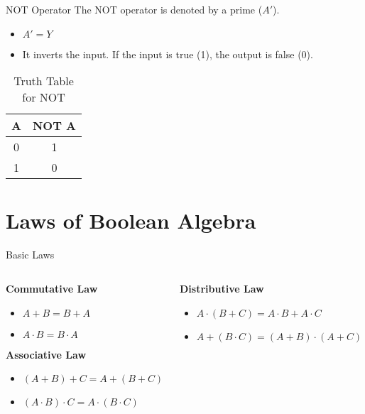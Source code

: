 \documentclass{beamer}
\begin{document}
\begin{frame}{NOT Operator}
    The NOT operator is denoted by a prime ($A'$).
    \begin{itemize}
        \item $A' = Y$
        \item It inverts the input. If the input is true (1), the output is false (0).
    \end{itemize}
    \begin{table}
        \centering
        \begin{tabular}{|c|c|}
            \hline
            \textbf{A} & \textbf{NOT A} \\
            \hline
            0 & 1 \\
            1 & 0 \\
            \hline
        \end{tabular}
        \caption{Truth Table for NOT}
    \end{table}
\end{frame}

\section{Laws of Boolean Algebra}
\begin{frame}{Basic Laws}
    \begin{columns}
        \begin{column}{0.5\textwidth}
            \textbf{Commutative Law}
            \begin{itemize}
                \item $A + B = B + A$
                \item $A \cdot B = B \cdot A$
            \end{itemize}
            \textbf{Associative Law}
            \begin{itemize}
                \item $(A + B) + C = A + (B + C)$
                \item $(A \cdot B) \cdot C = A \cdot (B \cdot C)$
            \end{itemize}
        \end{column}
        \begin{column}{0.5\textwidth}
            \textbf{Distributive Law}
            \begin{itemize}
                \item $A \cdot (B + C) = A \cdot B + A \cdot C$
                \item $A + (B \cdot C) = (A + B) \cdot (A + C)$
            \end{itemize}
        \end{column}
    \end{columns}
\end{frame}
\end{document}
